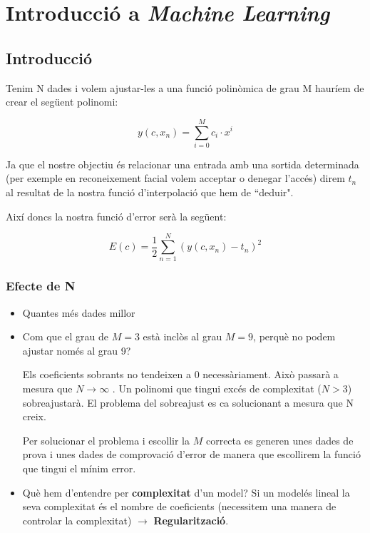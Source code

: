 
\chapter{Introducció a \emph{Machine Learning}}
\section{Introducció}

Tenim N dades i volem ajustar-les a una funció polinòmica de grau M hauríem de crear el següent polinomi:

\[ y(c, x_n) = \sum_{i=0}^{M} c_i·x^i \]

Ja que el nostre objectiu és relacionar una entrada amb una sortida determinada (per exemple en reconeixement facial volem acceptar o denegar l'accés) direm $t_n$ al resultat de la nostra funció d'interpolació que hem de ``deduir".

Així doncs la nostra funció d'error serà la següent:

\[ E(c) = \frac{1}{2} \sum_{n=1}^N (y(c, x_n) - t_n)^2 \]

\subsection{Efecte de N}

\begin{itemize}
	\item Quantes més dades millor
	\item Com que el grau de $M=3$ està inclòs al grau $M=9$, perquè no podem ajustar només al grau 9?
	
	Els coeficients sobrants no tendeixen a 0 necessàriament. Això passarà a mesura que $N \rightarrow \infty$ . Un polinomi que tingui excés de complexitat ($N > 3$) sobreajustarà. El problema del sobreajust es ca solucionant a mesura que N creix.
	
	Per solucionar el problema i escollir la $M$ correcta es generen unes dades de prova i unes dades de comprovació d'error de manera que escollirem la funció que tingui el mínim error.
	
	\begin{figure}[H]
		\centering
	\end{figure}
	
	\item Què hem d'entendre per \textbf{complexitat } d'un model? Si un modelés lineal la seva complexitat és el nombre de coeficients (necessitem una manera de controlar la complexitat) $\rightarrow$ \textbf{Regularització}.
\end{itemize}

